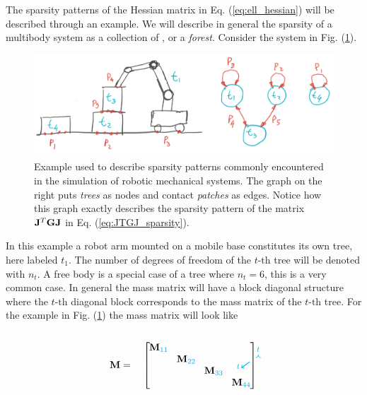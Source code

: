 The sparsity patterns of the Hessian matrix in Eq. (\ref{eq:ell_hessian}) will
be described through an example. We will describe in general the sparsity of a
multibody system as a collection of , or a
\textit{forest}. Consider the system in Fig. (\ref{fig:sparsity_example}).
\begin{figure}[!h]
	\centering
	\includegraphics[width=0.7\columnwidth]{figures/sparsity_example.png}
	\caption{\label{fig:sparsity_example} 
	Example used to describe sparsity patterns commonly encountered in the
	simulation of robotic mechanical systems. The graph on the right puts
	\textit{trees} as nodes and contact \textit{patches} as edges. Notice how
	this graph exactly describes the sparsity pattern of the matrix
	${\mathbf{J}}^T{\mathbf{G}}{\mathbf{J}}$ in Eq. (\ref{eq:JTGJ_sparsity}).}
\end{figure}
In this example a robot arm mounted on a mobile base constitutes its own tree,
here labeled $t_1$. The number of degrees of freedom of the $t\text{-th}$ tree
will be denoted with $n_t$. A free body is a special case of a tree where
$n_t=6$, this is a very common case. In general the mass matrix will have a
block diagonal structure where the $t\text{-th}$ diagonal block corresponds to
the mass matrix of the $t\text{-th}$ tree. For the example in Fig.
(\ref{fig:sparsity_example}) the mass matrix will look like\\\\
\begin{equation}
	\mf{M}=\quad
	\begin{bmatrix}
		\tikzmark{M_topleft}
		\diagentry{\mf{M}_{\cc{11}}}&&&\tikzmark{M_topright}\\
		&\diagentry{\mf{M}_{\cc{22}}}\\
		&&\diagentry{\mf{M}_{\cc{33}}}\\		
		\tikzmark{M_bottomleft}&&&\diagentry{\mf{M}_{\cc{44}}}
	\end{bmatrix}
\tikz[overlay,remember picture] {
	\draw[->,thick,color=cyan]
  ([yshift=3ex]M_topleft) -- ([yshift=3ex]M_topright) node[midway,above]
  {\scriptsize $t$}; 
  \draw[->,thick,color=cyan]
  ([yshift=1.5ex,xshift=-2ex]M_topleft) -- ([xshift=-4ex]M_bottomleft)
  node[near end,left] {\scriptsize $t$};}	
\end{equation}

